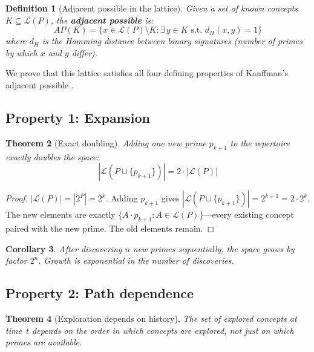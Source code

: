 \documentclass[11pt,a4paper]{article}
\newtheorem{theorem}{Theorem}
\newtheorem{corollary}[theorem]{Corollary}
\newtheorem{definition}[theorem]{Definition}
\begin{document}
\begin{definition}[Adjacent possible in the lattice]
\label{def:ap}
Given a set of known concepts $K \subseteq \mathcal{L}(P)$, the
\textbf{adjacent possible} is:
\begin{equation}
AP(K) = \{ x \in \mathcal{L}(P) \setminus K :
  \exists\, y \in K \text{ s.t.\ } d_H(x, y) = 1 \}
\end{equation}
where $d_H$ is the Hamming distance between binary signatures (number of
primes by which $x$ and $y$ differ).
\end{definition}

We prove that this lattice satisfies all four defining properties of
Kauffman's adjacent possible \citep{kauffman2000,loreto2017}.

\subsection{Property 1: Expansion}

\begin{theorem}[Exact doubling]
\label{thm:expansion}
Adding one new prime $p_{k+1}$ to the repertoire exactly doubles the space:
\begin{equation}
|\mathcal{L}(P \cup \{p_{k+1}\})| = 2 \cdot |\mathcal{L}(P)|
\end{equation}
\end{theorem}

\begin{proof}
$|\mathcal{L}(P)| = |2^P| = 2^k$. Adding $p_{k+1}$ gives
$|\mathcal{L}(P \cup \{p_{k+1}\})| = 2^{k+1} = 2 \cdot 2^k$. The new
elements are exactly $\{A \cdot p_{k+1} : A \in \mathcal{L}(P)\}$---every
existing concept paired with the new prime. The old elements remain.
\end{proof}

\begin{corollary}
\label{cor:exponential}
After discovering $n$ new primes sequentially, the space grows by factor
$2^n$. Growth is exponential in the number of discoveries.
\end{corollary}

\subsection{Property 2: Path dependence}

\begin{theorem}[Exploration depends on history]
\label{thm:path}
The set of explored concepts at time~$t$ depends on the order in which
concepts are explored, not just on which primes are available.
\end{theorem}
\end{document}
